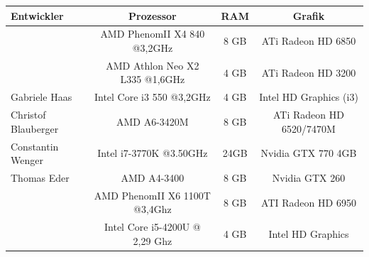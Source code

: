 \documentclass[10pt]{scrreprt}
\begin{document}
\begin{tabular}{|l|c|c|c|}
\hline
\rule[-1ex]{0pt}{4ex}\textsf{\textbf{Entwickler}} & \textsf{\textbf{Prozessor}} & \textsf{\textbf{RAM}} & \textsf{\textbf{Grafik}} \\
\hline
\hline
\rule[-1ex]{0pt}{4ex}\multirow{2}{*}{Fabian Knorr} & AMD PhenomII X4 840 @3,2GHz & 8 GB & ATi Radeon HD 6850 \\
\rule[-1ex]{0pt}{2ex} & AMD Athlon Neo X2 L335 @1,6GHz & 4 GB & ATi Radeon HD 3200 \\
\hline
\rule[-1ex]{0pt}{4ex}Gabriele Haas & Intel Core i3 550 @3,2GHz & 4 GB & Intel HD Graphics (i3) \\
\hline
\rule[-1ex]{0pt}{4ex}Christof Blauberger & AMD A6-3420M & 8 GB & ATi Radeon HD 6520/7470M \\
\hline
\rule[-1ex]{0pt}{4ex}Constantin Wenger & Intel i7-3770K @3.50GHz & 24GB & Nvidia GTX 770 4GB \\
\hline
\rule[-1ex]{0pt}{4ex}Thomas Eder & AMD A4-3400 & 8 GB & Nvidia GTX 260 \\
\hline
\rule[-1ex]{0pt}{4ex}\multirow{2}{*}{Sebastian Reichl} & AMD PhenomII X6 1100T @3,4Ghz & 8 GB & ATI Radeon HD 6950 \\
\rule[-1ex]{0pt}{2ex}& Intel Core i5-4200U @ 2,29 Ghz & 4 GB & Intel HD Graphics \\
\hline
\end{tabular}
\end{document}
